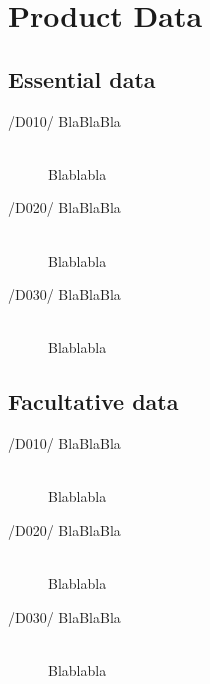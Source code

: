 \newpage
\section{Product Data}

\subsection{Essential data}
\begin{description}
\item[/D010/ BlaBlaBla]\hfill \\ Blablabla
\item[/D020/ BlaBlaBla]\hfill \\ Blablabla
\item[/D030/ BlaBlaBla]\hfill \\ Blablabla
\end{description}

\subsection{Facultative data}
\begin{description}
\item[/D010/ BlaBlaBla]\hfill \\ Blablabla
\item[/D020/ BlaBlaBla]\hfill \\ Blablabla
\item[/D030/ BlaBlaBla]\hfill \\ Blablabla
\end{description}
